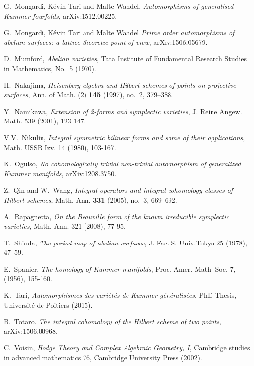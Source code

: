 \begin{thebibliography}{10}
G.~Mongardi, K\'evin Tari and Malte Wandel,
\emph{Automorphisms of generalised Kummer fourfolds},
arXiv:1512.00225. 

G.~Mongardi, K\'evin Tari and Malte Wandel
\emph{Prime order automorphisms of abelian surfaces: a lattice-theoretic point of view},
arXiv:1506.05679. 

D.~Mumford, \emph{Abelian varieties}, Tata Institute of Fundamental Research Studies in Mathematics, 
  No.~5 (1970).

H.~Nakajima, \emph{Heisenberg algebra and Hilbert schemes of points on
  projective surfaces}, Ann. of Math. (2) \textbf{145} (1997), no.~2, 379--388.

Y.~Namikawa,
\emph{Extension of 2-forms and symplectic varieties},
J. Reine Angew. Math. 
539 (2001), 123-147.

V.V.~Nikulin,
\emph{Integral symmetric bilinear forms and some of their applications},
Math. USSR Izv.
14 (1980), 103-167.

K.~Oguiso,
\emph{No cohomologically trivial non-trivial automorphism of generalized Kummer manifolds},
arXiv:1208.3750.

Z.~Qin and W.~Wang, \emph{Integral operators and integral cohomology classes of
  {H}ilbert schemes}, Math. Ann. \textbf{331} (2005), no.~3, 669--692.

A.~Rapagnetta,
\emph{On the Beauville form of the known irreducible symplectic varieties},
Math. Ann.
321 (2008), 77-95.


T.~Shioda, \emph{The period map of abelian surfaces}, J. Fac. S. Univ.Tokyo 25 (1978), 47--59.

E.~Spanier, 
\emph{The homology of Kummer manifolds},
Proc. Amer. Math. Soc.
7, (1956), 155-160.

K.~Tari, 
\emph{Automorphismes des vari\'et\'es de Kummer g\'en\'eralis\'ees},
PhD Thesis, Universit\'e de Poitiers (2015).

B.~Totaro, \emph{The integral cohomology of the Hilbert scheme of two points}, arXiv:1506.00968.

C.~Voisin, \emph{Hodge Theory and Complex Algebraic Geometry, I},
  Cambridge studies in advanced mathematics 76, Cambridge University Press (2002).

\end{thebibliography}
